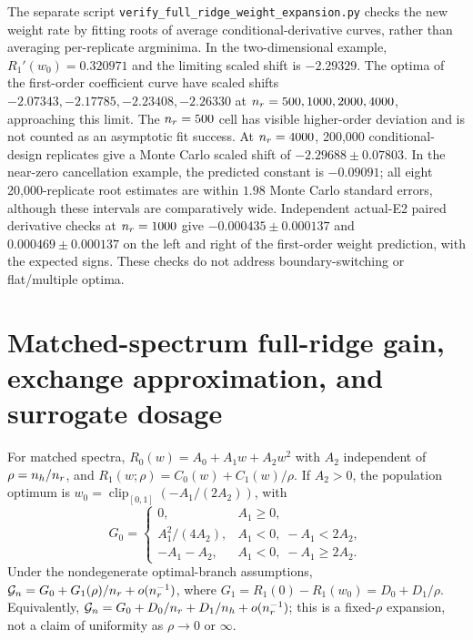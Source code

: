 The separate script \texttt{verify\_full\_ridge\_weight\_expansion.py} checks the new weight rate by fitting roots of average conditional-derivative curves, rather than averaging per-replicate argminima. In the two-dimensional example, $R_1'(w_0)=0.320971$ and the limiting scaled shift is $-2.29329$. The optima of the first-order coefficient curve have scaled shifts $-2.07343,-2.17785,-2.23408,-2.26330$ at $n_r=500,1000,2000,4000$, approaching this limit. The $n_r=500$ cell has visible higher-order deviation and is not counted as an asymptotic fit success. At $n_r=4000$, 200{,}000 conditional-design replicates give a Monte Carlo scaled shift of $-2.29688\pm0.07803$. In the near-zero cancellation example, the predicted constant is $-0.09091$; all eight 20{,}000-replicate root estimates are within $1.98$ Monte Carlo standard errors, although these intervals are comparatively wide. Independent actual-E2 paired derivative checks at $n_r=1000$ give $-0.000435\pm0.000137$ and $0.000469\pm0.000137$ on the left and right of the first-order weight prediction, with the expected signs. These checks do not address boundary-switching or flat/multiple optima.

\section{Matched-spectrum full-ridge gain, exchange approximation, and surrogate dosage}
\label{supp:doseexchange}

For matched spectra, $R_0(w)=A_0+A_1w+A_2w^2$ with $A_2$ independent of $\rho=n_h/n_r$, and $R_1(w;\rho)=C_0(w)+C_1(w)/\rho$. If $A_2>0$, the population optimum is $w_0=\operatorname{clip}_{[0,1]}(-A_1/(2A_2))$, with
\begin{equation}
 G_0=\begin{cases}
 0,&A_1\ge0,\\
 A_1^2/(4A_2),&A_1<0,\;-A_1<2A_2,\\
 -A_1-A_2,&A_1<0,\;-A_1\ge2A_2.
 \end{cases}
\end{equation}
Under the nondegenerate optimal-branch assumptions, $\mathcal G_n=G_0+G_1(\rho)/n_r+o(n_r^{-1})$, where $G_1=R_1(0)-R_1(w_0)=D_0+D_1/\rho$. Equivalently, $\mathcal G_n=G_0+D_0/n_r+D_1/n_h+o(n_r^{-1})$; this is a fixed-$\rho$ expansion, not a claim of uniformity as $\rho\to0$ or $\infty$.

